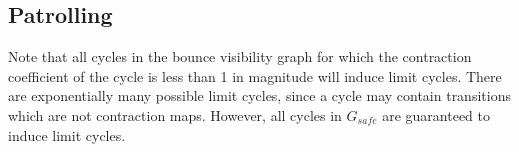 \documentclass[]{styles/svproc}  %
\begin{document}

%



%
%


\subsection{Patrolling}

Note that all cycles in the bounce visibility graph for which the contraction coefficient of
the cycle is less than 1 in magnitude will induce limit cycles. There are
exponentially many possible limit cycles, since a cycle may contain
transitions which are not contraction maps. However, all cycles in $G_{safe}$
are guaranteed to induce limit cycles.

%
%
%
%
%
\end{document}

